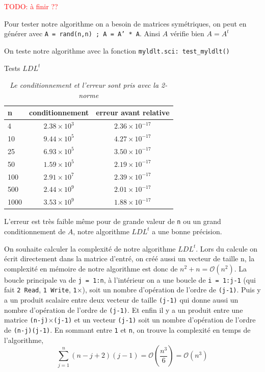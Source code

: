 \documentclass{article}
\begin{document}
\textcolor{red}{TODO: à finir ??}

Pour tester notre algorithme on a besoin de matrices symétriques, on peut en générer avec \texttt{A = rand(n,n) ; A = A' * A}.
Ainsi \(A\) vérifie bien \(A = A^t\)
\newline\indent

On teste notre algorithme avec la fonction \texttt{myldlt.sci: test\_myldlt()}

\begin{table}[H]
\renewcommand*\arraystretch{1.3}
\begin{center}
\caption{Tests \(LDL^t\)}
\begin{tabular}{|l|c|c|}
  \hline
  n & conditionnement & erreur avant relative \\
  \hline
	4	& \(2.38 \times 10^3\)	& \(2.36 \times 10^{-17}\) \\
	10	& \(9.44 \times 10^5\)	& \(4.27 \times 10^{-17}\) \\
	25	& \(6.93 \times 10^5\)	& \(3.50 \times 10^{-17}\) \\
	50	& \(1.59 \times 10^5\)	& \(2.19 \times 10^{-17}\) \\
	100	& \(2.91 \times 10^7\)	& \(2.39 \times 10^{-17}\) \\
	500	& \(2.44 \times 10^9\)	& \(2.01 \times 10^{-17}\) \\
	1000& \(3.53 \times 10^9\)	& \(1.88 \times 10^{-17}\) \\
  \hline
\end{tabular}
\caption*{\textit{Le conditionnement et l'erreur sont pris avec la 2-norme}}
\end{center}
\end{table}


L'erreur est très faible même pour de grande valeur de \texttt{n} ou un grand conditionnement de \(A\), notre algorithme \(LDL^t\) a une bonne précision.\newline\indent

On souhaite calculer la complexité de notre algorithme \(LDL^t\).\newline
Lors du calcule on écrit directement dans la matrice d'entré, on créé aussi un vecteur de taille n, la complexité en mémoire de notre algorithme est donc de \(n^2+n = \mathcal{O}(n^2)\).\newline
La boucle principale va de \texttt{j = 1:n}, à l'intérieur on a une boucle de \texttt{i = 1:j-1} (qui fait \texttt{2 Read}, \texttt{1 Write}, \texttt{1}\(\times\)), soit un nombre d'opération de l'ordre de \texttt{(j-1)}.\newline
Puis y a un produit scalaire entre deux vecteur de taille \texttt{(j-1)} qui donne aussi un nombre d'opération de l'ordre de \texttt{(j-1)}. \newline
Et enfin il y a un produit entre une matrice \texttt{(n-j)}\(\times\)\texttt{(j-1)} et un vecteur \texttt{(j-1)} soit un nombre d'opération de l'ordre de \texttt{(n-j)(j-1)}.\newline
En sommant entre \texttt{1} et \texttt{n}, on trouve la complexité en temps de l'algorithme,
\[
\sum_{j=1}^n (n-j+2)(j-1) = \mathcal{O}(\frac{n^3}{6}) = \mathcal{O}(n^3)
\]
\end{document}
